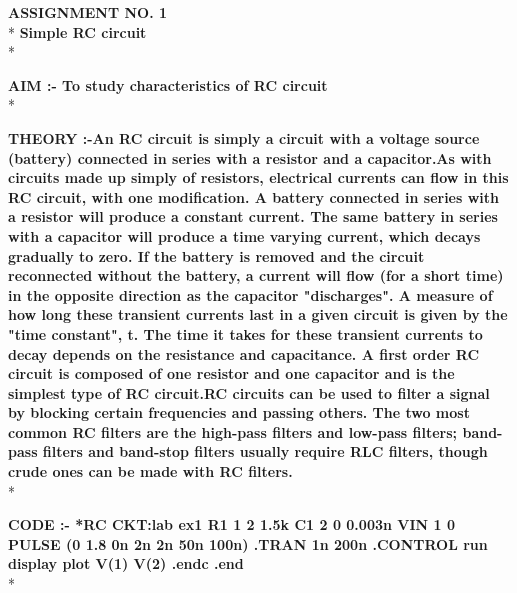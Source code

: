 \documentclass{article}
\begin{document}
\begin{center}
\Large{{\bf\color{rosewood}ASSIGNMENT NO. 1}}\\*
\vspace{2mm}
\large{{\bf\textcolor{rosewood}{ Simple RC circuit}}}\\*
\vspace{5mm}
\end{center}
\begin{flushleft}
\large{{\bf\textcolor{rosewood}{AIM :-} To study characteristics of RC circuit}}\vspace{5mm}\\*

\large{{\bf\textcolor{rosewood}{THEORY} :-An RC circuit is simply a circuit with a voltage source (battery) connected in series with a resistor and a capacitor.As with circuits made up simply of resistors, electrical currents can flow in this RC circuit, with one 
modification. A battery connected in series with a resistor will produce a constant current. The same battery in series with a capacitor will produce a time varying current, which decays gradually to zero. If the battery is removed and the circuit reconnected without the battery, a current will flow (for a short time) in the opposite direction as the capacitor "discharges". A measure of how long these transient currents last in a given circuit is given by the "time constant", t.
The time it takes for these transient currents to decay depends on the resistance and capacitance.  A first order RC circuit is composed of one resistor and one capacitor and is the simplest type of RC circuit.RC circuits can be used to filter a signal by blocking certain frequencies and passing others. The two most common RC filters are the high-pass filters and low-pass filters; band-pass filters and band-stop filters usually require RLC filters, though crude ones can be made with RC filters.}}\vspace{5mm}\\*

\large{{\bf\textcolor{rosewood}{ CODE} :-
*RC CKT:lab ex1\newline
R1 1 2 1.5k\newline
C1 2 0 0.003n\newline
VIN 1 0 PULSE (0 1.8 0n 2n 2n 50n 100n)\newline
.TRAN 1n 200n\newline
.CONTROL\newline
run\newline
display\newline
plot V(1) V(2)\newline
.endc \newline
.end \newline}}\\*



\end{flushleft}
\end{document}
